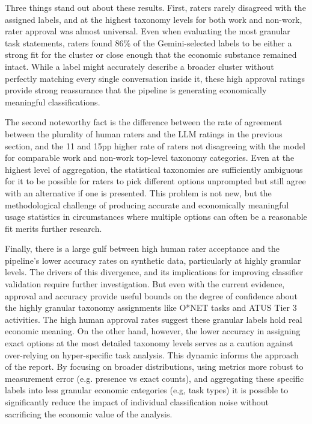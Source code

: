 \documentclass[11pt,a4paper]{article}
\begin{document}
Three things stand out about these results. First, raters rarely disagreed with the assigned labels, and at the highest taxonomy levels for both work and non-work, rater approval was almost universal. Even when evaluating the most granular task statements, raters found 86\% of the Gemini-selected labels to be either a strong fit for the cluster or close enough that the economic substance remained intact. While a label might accurately describe a broader cluster without perfectly matching every single conversation inside it, these high approval ratings provide strong reassurance that the pipeline is generating economically meaningful classifications.

The second noteworthy fact is the difference between the rate of agreement between the plurality of human raters and the LLM ratings in the previous section, and the 11 and 15pp higher rate of raters not disagreeing with the model for comparable work and non-work top-level taxonomy categories. Even at the highest level of aggregation, the statistical taxonomies are sufficiently ambiguous for it to be possible for raters to pick different options unprompted but still agree with an alternative if one is presented.  This problem is not new, but the methodological challenge of producing accurate and economically meaningful usage statistics in circumstances where multiple options can often be a reasonable fit merits further research. 

Finally, there is a large gulf between high human rater acceptance and the pipeline's lower accuracy rates on synthetic data, particularly at highly granular levels. The drivers of this divergence, and its implications for improving classifier validation require further investigation. But even with the current evidence, approval and accuracy provide useful bounds on the degree of confidence about the highly granular taxonomy assignments like O*NET tasks and  ATUS Tier 3 activities. The high human approval rates suggest these granular labels hold real economic meaning. On the other hand, however, the lower accuracy in assigning exact options at the most detailed taxonomy levels  serves as a caution against over-relying on hyper-specific task analysis. This dynamic informs the approach of the report. By focusing on broader distributions, using metrics more robust to measurement error (e.g. presence vs exact counts), and aggregating these specific labels into  less granular economic categories (e.g, \cite{NBERw33941} task types) it is possible to significantly reduce the impact of individual classification noise without sacrificing the economic value of the analysis.
\end{document}
